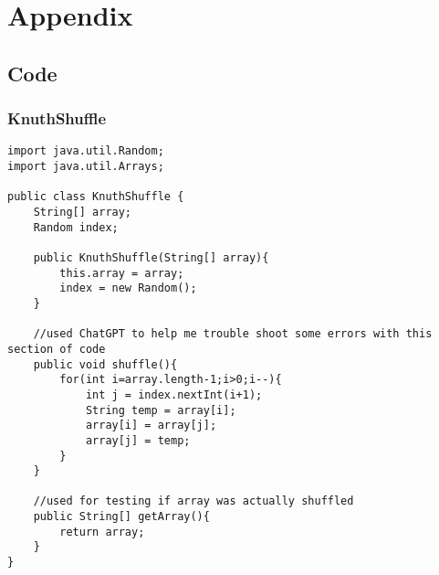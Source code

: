 \documentclass[10pt]{article}
\begin{document}

\section{Appendix}

\subsection{Code}

\subsubsection{KnuthShuffle}
\lstset{numbers=left, numberstyle=\tiny, stepnumber=1, numbersep=5pt, basicstyle=\footnotesize\ttfamily}
\begin{lstlisting}[frame=single, ]  
import java.util.Random;
import java.util.Arrays;

public class KnuthShuffle {
    String[] array;
    Random index;

    public KnuthShuffle(String[] array){
        this.array = array;
        index = new Random();
    }

    //used ChatGPT to help me trouble shoot some errors with this section of code
    public void shuffle(){
        for(int i=array.length-1;i>0;i--){
            int j = index.nextInt(i+1);
            String temp = array[i];
            array[i] = array[j];
            array[j] = temp;
        }
    }

    //used for testing if array was actually shuffled
    public String[] getArray(){
        return array;
    }
}
\end{lstlisting}
\end{document}
